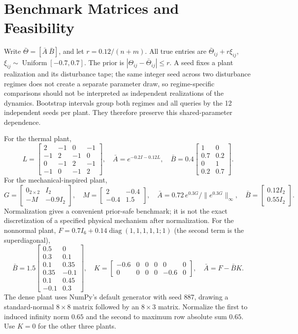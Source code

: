 \documentclass{l4dc2026}
\begin{document}
\clearpage

\appendix
\section{Benchmark Matrices and Feasibility}\label{app:plants}
Write $\bar\Theta=[\bar A\ \bar B]$, and let $r=0.12/(n+m)$. All true entries are $\bar\Theta_{ij}+r\xi_{ij}$, $\xi_{ij}\sim\operatorname{Uniform}[-0.7,0.7]$. The prior is $|\Theta_{ij}-\bar\Theta_{ij}|\leq r$. A seed fixes a plant realization and its disturbance tape; the same integer seed across two disturbance regimes does not create a separate parameter draw, so regime-specific comparisons should not be interpreted as independent realizations of the dynamics. Bootstrap intervals group both regimes and all queries by the 12 independent seeds per plant. They therefore preserve this shared-parameter dependence.

For the thermal plant,
\[
 L=\begin{bmatrix}2&-1&0&-1\\-1&2&-1&0\\0&-1&2&-1\\-1&0&-1&2\end{bmatrix},\quad
 \bar A=e^{-0.2I-0.12L},\quad
 \bar B=0.4\begin{bmatrix}1&0\\0.7&0.2\\0&1\\0.2&0.7\end{bmatrix}.
\]
For the mechanical-inspired plant,
\[
 G=\begin{bmatrix}0_{2\times2}&I_2\\-M&-0.9I_2\end{bmatrix},\quad
 M=\begin{bmatrix}2&-0.4\\-0.4&1.5\end{bmatrix},\quad
 \bar A=0.72\,e^{0.3G}/\|e^{0.3G}\|_\infty,\quad
 \bar B=\begin{bmatrix}0.12I_2\\0.55I_2\end{bmatrix}.
\]
Normalization gives a convenient prior-safe benchmark; it is not the exact discretization of a specified physical mechanism after normalization. For the nonnormal plant, $F=0.7I_6+0.14\operatorname{diag}(1,1,1,1,1;1)$ (the second term is the superdiagonal),
\[
 \bar B=1.5\begin{bmatrix}0.5&0\\0.3&0.1\\0.1&0.35\\0.35&-0.1\\0.1&0.45\\-0.1&0.3\end{bmatrix},\quad
 K=\begin{bmatrix}-0.6&0&0&0&0&0\\0&0&0&0&-0.6&0\end{bmatrix},\quad \bar A=F-\bar BK.
\]
The dense plant uses NumPy's default generator with seed 887, drawing a standard-normal $8\times8$ matrix followed by an $8\times3$ matrix. Normalize the first to induced infinity norm $0.65$ and the second to maximum row absolute sum $0.65$. Use $K=0$ for the other three plants.
\end{document}
